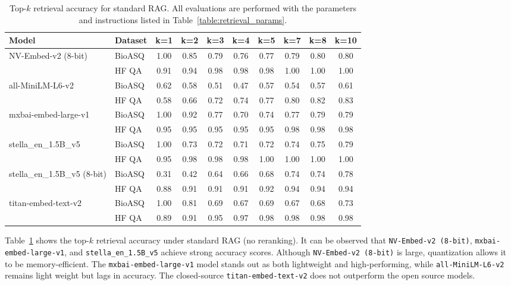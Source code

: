 \documentclass[pdflatex,sn-mathphys-num]{sn-jnl}%
\theoremstyle{thmstyleone}%
\theoremstyle{thmstyletwo}%
\theoremstyle{thmstylethree}%
\begin{document}
\begin{table}[h]
\centering
\small
\begin{tabular}{l l c c c c c c c c}
\hline
\textbf{Model} & \textbf{Dataset} & \textbf{k=1} & \textbf{k=2} & \textbf{k=3} & \textbf{k=4} & \textbf{k=5} & \textbf{k=7} & \textbf{k=8} & \textbf{k=10} \\
\hline
\multirow{2}{*}{NV-Embed-v2 (8-bit)} 
 & BioASQ & 1.00 & 0.85 & 0.79 & 0.76 & 0.77 & 0.79 & 0.80 & 0.80 \\
 & HF QA  & 0.91 & 0.94 & 0.98 & 0.98 & 0.98 & 1.00 & 1.00 & 1.00 \\
\hline
\multirow{2}{*}{all-MiniLM-L6-v2} 
 & BioASQ & 0.62 & 0.58 & 0.51 & 0.47 & 0.57 & 0.54 & 0.57 & 0.61 \\
 & HF QA  & 0.58 & 0.66 & 0.72 & 0.74 & 0.77 & 0.80 & 0.82 & 0.83 \\
\hline
\multirow{2}{*}{mxbai-embed-large-v1} 
 & BioASQ & 1.00 & 0.92 & 0.77 & 0.70 & 0.74 & 0.77 & 0.79 & 0.79 \\
 & HF QA  & 0.95 & 0.95 & 0.95 & 0.95 & 0.95 & 0.98 & 0.98 & 0.98 \\
\hline
\multirow{2}{*}{stella\_en\_1.5B\_v5} 
 & BioASQ & 1.00 & 0.73 & 0.72 & 0.71 & 0.72 & 0.74 & 0.75 & 0.79 \\
 & HF QA  & 0.95 & 0.98 & 0.98 & 0.98 & 1.00 & 1.00 & 1.00 & 1.00 \\
\hline
\multirow{2}{*}{stella\_en\_1.5B\_v5 (8-bit)} 
 & BioASQ & 0.31 & 0.42 & 0.64 & 0.66 & 0.68 & 0.74 & 0.74 & 0.78 \\
 & HF QA  & 0.88 & 0.91 & 0.91 & 0.91 & 0.92 & 0.94 & 0.94 & 0.94 \\
\hline
\multirow{2}{*}{titan-embed-text-v2} 
 & BioASQ & 1.00 & 0.81 & 0.69 & 0.67 & 0.69 & 0.67 & 0.68 & 0.73 \\
 & HF QA  & 0.89 & 0.91 & 0.95 & 0.97 & 0.98 & 0.98 & 0.98 & 0.98 \\
\hline
\end{tabular}
\caption{Top-$k$ retrieval accuracy for standard RAG. All evaluations are performed with the parameters and instructions listed in Table~\ref{table:retrieval_params}.}
\label{table:standard_rag_results}
\end{table}

Table~\ref{table:standard_rag_results} shows the top-$k$ retrieval accuracy under standard RAG (no reranking). It can be observed that \texttt{NV-Embed-v2 (8-bit)}, \texttt{mxbai-embed-large-v1}, and \texttt{stella\_en\_1.5B\_v5} achieve strong accuracy scores. Although \texttt{NV-Embed-v2 (8-bit)} is large, quantization allows it to be memory-efficient. The \texttt{mxbai-embed-large-v1} model stands out as both lightweight and high-performing, while \texttt{all-MiniLM-L6-v2} remains light weight but lags in accuracy. The closed-source \texttt{titan-embed-text-v2} does not outperform the open source models.
\end{document}
